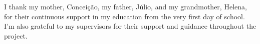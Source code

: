 
\begin{acknowledgments} 

    I thank my mother, Conceição, my father, Júlio, and my
    grandmother, Helena, for their continuous support in my education
    from the very first day of school. I'm also grateful to my
    supervisors for their support and guidance throughout the
    project.
    
\end{acknowledgments}
\clearpage
\thispagestyle{empty}
\cleardoublepage
\singlespacing
{}
\changefontsize{14pt}